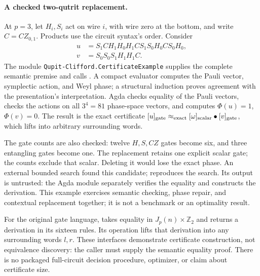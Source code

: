 \paragraph{A checked two-qutrit replacement.}\label{sec:client-example}
At $p=3$, let $H_i,S_i$ act on wire $i$, with wire zero at the bottom,
and write $C=CZ_{0,1}$. Products use the circuit syntax's order. Consider
\[
\begin{aligned}
u &= S_1 C H_1 H_0 H_1 C S_1 S_0 H_0 C S_0 H_0,\\
v &= S_0 S_0 S_1 H_1 H_1 C.
\end{aligned}
\]
The module \texttt{Qupit-Clifford.CertificateExample} supplies the
complete semantic premise and calls . A compact evaluator
computes the Pauli vector, symplectic action, and Weyl phase; a structural
induction proves agreement with the presentation's interpretation.
Agda checks equality of the Pauli vectors, checks the actions on all
$3^4=81$ phase-space vectors, and computes
$\Phi(u)=1$, $\Phi(v)=0$. The result is the exact certificate
$[u]_{\rm gate}\approx_{\rm exact}
[\omega]_{\rm scalar}\bullet[v]_{\rm gate}$,
which  lifts into arbitrary surrounding words.

The gate counts are also checked: twelve $H,S,CZ$ gates become six,
and three entangling gates become one. The replacement retains one
explicit scalar gate; the counts exclude that scalar. Deleting it
would lose the exact phase. An external bounded search found this
candidate;  reproduces the
search. Its output is untrusted: the Agda module separately verifies
the equality and constructs the derivation. This example exercises
semantic checking, phase repair, and contextual replacement together;
it is not a benchmark or an optimality result.

For the original gate language,  takes
equality in $J_p(n)\times\mathbb Z_2$ and returns a derivation in its
sixteen rules. Its  operation lifts that derivation into
any surrounding words $l,r$. These interfaces demonstrate certificate
construction, not equivalence discovery: the caller must supply the
semantic equality proof. There is no packaged full-circuit decision
procedure, optimizer, or claim about certificate size.
